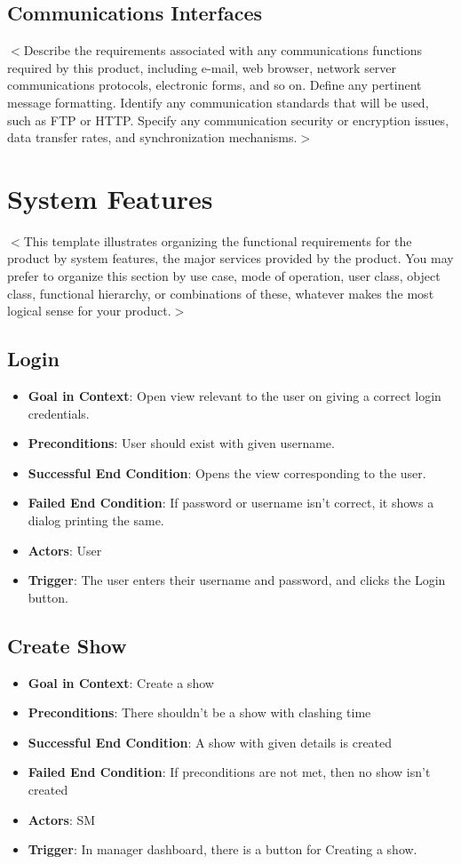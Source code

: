 \documentclass{scrreprt}
\begin{document}
\section{Communications Interfaces}
$<$Describe the requirements associated with any communications functions 
required by this product, including e-mail, web browser, network server 
communications protocols, electronic forms, and so on. Define any pertinent 
message formatting. Identify any communication standards that will be used, such 
as FTP or HTTP. Specify any communication security or encryption issues, data 
transfer rates, and synchronization mechanisms.$>$


\chapter{System Features}
$<$This template illustrates organizing the functional requirements for the 
product by system features, the major services provided by the product. You may 
prefer to organize this section by use case, mode of operation, user class, 
object class, functional hierarchy, or combinations of these, whatever makes the 
most logical sense for your product.$>$

\section{Login}
\begin{itemize}
\item \textbf{Goal in Context}: Open view relevant to the user on giving a correct login credentials.
\item \textbf{Preconditions}: User should exist with given username.
\item \textbf{Successful End Condition}: Opens the view corresponding to the user.
\item \textbf{Failed End Condition}: If password or username isn't correct, it shows a dialog printing the same.
\item \textbf{Actors}: User
\item \textbf{Trigger}: The user enters their username and password, and clicks the Login button.
\end{itemize}

\section{Create Show}
\begin{itemize}
\item \textbf{Goal in Context}: Create a show
\item \textbf{Preconditions}: There shouldn't be a show with clashing time
\item \textbf{Successful End Condition}: A show with given details is created
\item \textbf{Failed End Condition}: If preconditions are not met, then no show isn't created
\item \textbf{Actors}: SM
\item \textbf{Trigger}: In manager dashboard, there is a button for Creating a show.
\end{itemize}
\end{document}

